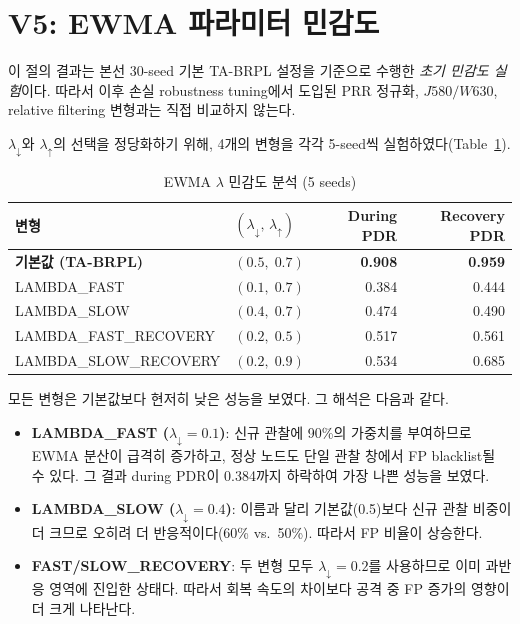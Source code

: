 \documentclass[12pt,a4paper]{article}
\begin{document}
\section{V5: EWMA 파라미터 민감도}

이 절의 결과는 본선 30-seed 기본 TA-BRPL 설정을 기준으로 수행한
\emph{초기 민감도 실험}이다. 따라서 이후 손실 robustness tuning에서 도입된
PRR 정규화, $J580/W630$, relative filtering 변형과는 직접 비교하지 않는다.

$\lambda_\downarrow$와 $\lambda_\uparrow$의 선택을 정당화하기 위해,
4개의 변형을 각각 5-seed씩 실험하였다(Table~\ref{tab:lambda}).

\begin{table}[t]
  \centering
  \caption{EWMA $\lambda$ 민감도 분석 (5 seeds)}
  \label{tab:lambda}
  \begin{tabular}{llrr}
    \toprule
    변형 & $(\lambda_\downarrow,\,\lambda_\uparrow)$ & During PDR & Recovery PDR \\
    \midrule
    \textbf{기본값 (TA-BRPL)} & $(0.5,\;0.7)$ & \textbf{0.908} & \textbf{0.959} \\
    LAMBDA\_FAST              & $(0.1,\;0.7)$ & 0.384 & 0.444 \\
    LAMBDA\_SLOW              & $(0.4,\;0.7)$ & 0.474 & 0.490 \\
    LAMBDA\_FAST\_RECOVERY    & $(0.2,\;0.5)$ & 0.517 & 0.561 \\
    LAMBDA\_SLOW\_RECOVERY    & $(0.2,\;0.9)$ & 0.534 & 0.685 \\
    \bottomrule
  \end{tabular}
\end{table}

모든 변형은 기본값보다 현저히 낮은 성능을 보였다. 그 해석은 다음과 같다.
\begin{itemize}
  \item \textbf{LAMBDA\_FAST ($\lambda_\downarrow=0.1$)}: 신규 관찰에 90\%의 가중치를 부여하므로
  EWMA 분산이 급격히 증가하고, 정상 노드도 단일 관찰 창에서 FP blacklist될 수 있다.
  그 결과 during PDR이 0.384까지 하락하여 가장 나쁜 성능을 보였다.
  \item \textbf{LAMBDA\_SLOW ($\lambda_\downarrow=0.4$)}: 이름과 달리 기본값(0.5)보다
  신규 관찰 비중이 더 크므로 오히려 더 반응적이다(60\% vs.\ 50\%).
  따라서 FP 비율이 상승한다.
  \item \textbf{FAST/SLOW\_RECOVERY}: 두 변형 모두 $\lambda_\downarrow=0.2$를 사용하므로
  이미 과반응 영역에 진입한 상태다. 따라서 회복 속도의 차이보다 공격 중 FP 증가의 영향이 더 크게 나타난다.
\end{itemize}
\end{document}
